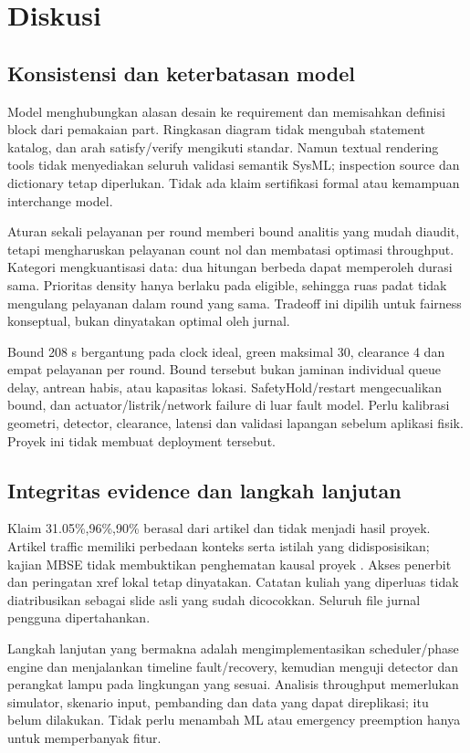 \section{Diskusi}
\subsection{Konsistensi dan keterbatasan model}
Model menghubungkan alasan desain ke requirement dan memisahkan definisi block dari pemakaian part. Ringkasan diagram tidak mengubah statement katalog, dan arah satisfy/verify mengikuti standar. Namun textual rendering tools tidak menyediakan seluruh validasi semantik SysML; inspection source dan dictionary tetap diperlukan. Tidak ada klaim sertifikasi formal atau kemampuan interchange model.

Aturan sekali pelayanan per round memberi bound analitis yang mudah diaudit, tetapi mengharuskan pelayanan count nol dan membatasi optimasi throughput. Kategori mengkuantisasi data: dua hitungan berbeda dapat memperoleh durasi sama. Prioritas density hanya berlaku pada eligible, sehingga ruas padat tidak mengulang pelayanan dalam round yang sama. Tradeoff ini dipilih untuk fairness konseptual, bukan dinyatakan optimal oleh jurnal.

Bound 208 s bergantung pada clock ideal, green maksimal 30, clearance 4 dan empat pelayanan per round. Bound tersebut bukan jaminan individual queue delay, antrean habis, atau kapasitas lokasi. SafetyHold/restart mengecualikan bound, dan actuator/listrik/network failure di luar fault model. Perlu kalibrasi geometri, detector, clearance, latensi dan validasi lapangan sebelum aplikasi fisik. Proyek ini tidak membuat deployment tersebut.

\subsection{Integritas evidence dan langkah lanjutan}
Klaim 31.05\%,96\%,90\% berasal dari artikel dan tidak menjadi hasil proyek. Artikel traffic memiliki perbedaan konteks serta istilah yang didisposisikan; kajian MBSE tidak membuktikan penghematan kausal proyek \parencite{campo2023}. Akses penerbit dan peringatan xref lokal tetap dinyatakan. Catatan kuliah yang diperluas tidak diatribusikan sebagai slide asli yang sudah dicocokkan. Seluruh file jurnal pengguna dipertahankan.

Langkah lanjutan yang bermakna adalah mengimplementasikan scheduler/phase engine dan menjalankan timeline fault/recovery, kemudian menguji detector dan perangkat lampu pada lingkungan yang sesuai. Analisis throughput memerlukan simulator, skenario input, pembanding dan data yang dapat direplikasi; itu belum dilakukan. Tidak perlu menambah ML atau emergency preemption hanya untuk memperbanyak fitur.

